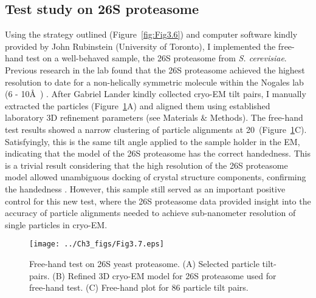 \subsection{Test study on 26S proteasome}

Using the strategy outlined (Figure~\ref{fig:Fig3.6}) and computer software kindly provided by John Rubinstein (University of Toronto), I implemented the free-hand test on a well-behaved sample, the 26S proteasome from \emph{S. cerevisiae}. Previous research in the lab found that the 26S proteasome achieved the highest resolution to date for a non-helically symmetric molecule within the Nogales lab (6 - 10\AA\ ) \cite{Lander_2012}. After Gabriel Lander kindly collected cryo-EM tilt pairs, I manually extracted the particles (Figure~\ref{fig:Fig3.7}A) and aligned them using established laboratory 3D refinement parameters (see Materials \& Methods). The free-hand test results showed a narrow clustering of particle alignments at 20\textdegree\ (Figure~\ref{fig:Fig3.7}C). Satisfyingly, this is the same tilt angle applied to the sample holder in the EM, indicating that the model of the 26S proteasome has the correct handedness.  This is a trivial result considering that the high resolution of the 26S proteasome model allowed unambiguous docking of crystal structure components, confirming the handedness \cite{Lander_2012}. However, this sample still served as an important positive control for this new test, where the 26S proteasome data provided insight into the accuracy of particle alignments needed to achieve sub-nanometer resolution of single particles in cryo-EM. \\
\begin{figure}
\centering
\texttt{[image: ../Ch3\_figs/Fig3.7.eps]}
\caption[Free-hand test on 26S yeast proteasome]{Free-hand test on 26S yeast proteasome. (A) Selected particle tilt-pairs.  (B) Refined 3D cryo-EM model for 26S proteasome used for free-hand test.  (C) Free-hand plot for 86 particle tilt pairs.}
\label{fig:Fig3.7}
\end{figure}
\indent 

